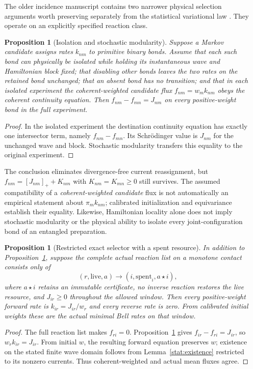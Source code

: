 \documentclass[11pt,oneside,openany]{book}
\newtheorem{proposition}[theorem]{Proposition}
\theoremstyle{definition}
\theoremstyle{remark}\newtheorem{remark}[theorem]{Remark}
\begin{document}
The older incidence manuscript contains two narrower physical selection
arguments worth preserving separately from the statistical variational
law \cite{M02}. They operate on an explicitly specified reaction class.

\begin{proposition}[Isolation and stochastic modularity]
\label{stat:isolated-bond}
Suppose a Markov candidate assigns rates $k_{nm}$ to primitive binary
bonds. Assume that each such bond can physically be isolated while holding
its instantaneous wave and Hamiltonian block fixed; that disabling other
bonds leaves the two rates on the retained bond unchanged; that an absent
bond has no transition; and that in each isolated experiment the
coherent-weighted candidate flux $f_{nm}=w_mk_{nm}$ obeys the coherent
continuity equation. Then $f_{nm}-f_{mn}=J_{nm}$ on every positive-weight
bond in the full experiment.
\end{proposition}
\begin{proof}
In the isolated experiment the destination continuity equation has exactly
one intersector term, namely $f_{nm}-f_{mn}$. Its Schr\"odinger value is
$J_{nm}$ for the unchanged wave and block. Stochastic modularity transfers
this equality to the original experiment.
\end{proof}

The conclusion eliminates divergence-free current reassignment, but
$f_{nm}=[J_{nm}]_++K_{nm}$ with $K_{nm}=K_{mn}\geq0$ still survives.
The assumed compatibility of a \emph{coherent-weighted candidate} flux is
not automatically an empirical statement about $\pi_mk_{nm}$; calibrated
initialization and equivariance establish their equality. Likewise,
Hamiltonian locality alone does not imply stochastic modularity or the
physical ability to isolate every joint-configuration bond of an
entangled preparation.

\begin{proposition}[Restricted exact selector with a spent resource]
\label{stat:licensed}
In addition to Proposition~\ref{stat:isolated-bond}, suppose the complete
actual reaction list on a monotone contact consists only of
\[
 (r,\mathrm{live},a)\longrightarrow(i,\mathrm{spent}_i,a\star i),
\]
where $a\star i$ retains an immutable certificate, no inverse reaction
restores the live resource, and $J_{ir}\geq0$ throughout the allowed
window. Then every positive-weight forward rate is
$k_{ir}=J_{ir}/w_r$ and every reverse rate is zero. From calibrated initial
weights these are the actual minimal Bell rates on that window.
\end{proposition}
\begin{proof}
The full reaction list makes $f_{ri}=0$. Proposition~\ref{stat:isolated-bond}
gives $f_{ir}-f_{ri}=J_{ir}$, so $w_rk_{ir}=J_{ir}$. From initial $w$, the
resulting forward equation preserves $w$; existence on the stated finite
wave domain follows from Lemma~\ref{stat:existence} restricted to its
nonzero currents. Thus coherent-weighted and actual mean fluxes agree.
\end{proof}
\end{document}
